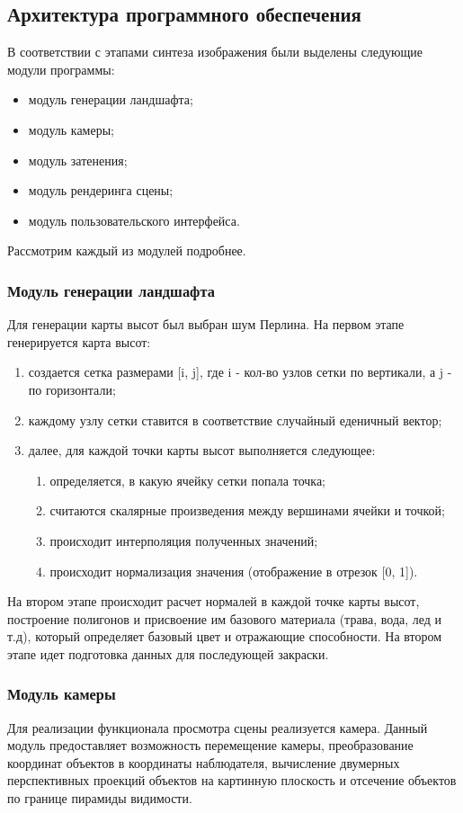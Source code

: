 \documentclass{article}
\begin{document}
	\subsection{Архитектура программного обеспечения}
	\indent В соответствии с этапами синтеза изображения были выделены следующие модули программы:
	\begin{itemize}
		\item модуль генерации ландшафта;
		\item модуль камеры;
		\item модуль затенения;
		\item модуль рендеринга сцены;
		\item модуль пользовательского интерфейса.
	\end{itemize}
	Рассмотрим каждый из модулей подробнее.
	\subsubsection{Модуль генерации ландшафта}
	\indent Для генерации карты высот был выбран шум Перлина. На первом этапе генерируется карта высот:
	\renewcommand{\labelenumii}{\arabic{enumi}.\arabic{enumii}.}
	\begin{enumerate}
		\item создается сетка размерами [i, j], где i - кол-во узлов сетки по вертикали, а j - по горизонтали;
		\item каждому узлу сетки ставится в соответствие случайный еденичный вектор;
		\item далее, для каждой точки карты высот выполняется следующее:
		\begin{enumerate}
			\item определяется, в какую ячейку сетки попала точка;
			\item считаются скалярные произведения между вершинами ячейки и точкой;
			\item происходит интерполяция полученных значений;
			\item происходит нормализация значения (отображение в отрезок [0, 1]).
		\end{enumerate}
	\end{enumerate}
	\indent На втором этапе происходит расчет нормалей в каждой точке карты высот, построение полигонов и присвоение им базового материала (трава, вода, лед и т.д), который определяет базовый цвет и отражающие способности. На втором этапе идет подготовка данных для последующей закраски.
	\subsubsection{Модуль камеры}
	\indent Для реализации функционала просмотра сцены реализуется камера. Данный модуль предоставляет возможность перемещение камеры, преобразование координат объектов в координаты наблюдателя, вычисление двумерных перспективных проекций объектов на картинную плоскость и отсечение объектов по границе пирамиды видимости.
\end{document}
